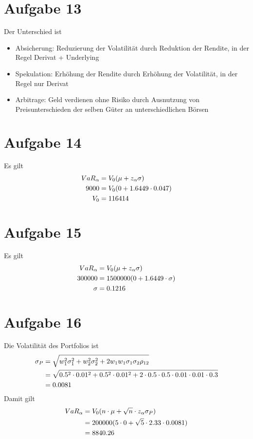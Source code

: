 \documentclass{article}
\begin{document}
	\section*{Aufgabe 13}
	Der Unterschied ist
	\begin{itemize}
		\item Absicherung: Reduzierung der Volatilität durch Reduktion der Rendite, in der Regel Derivat + Underlying
		\item Spekulation: Erhöhung der Rendite durch Erhöhung der Volatilität, in der Regel nur Derivat
		\item Arbitrage: Geld verdienen ohne Risiko durch Ausnutzung von Preisunterschieden der selben Güter an unterschiedlichen Börsen
	\end{itemize}
	
	\section*{Aufgabe 14}
	Es gilt
	\begin{align}
		VaR_{\alpha} &= V_0(\mu + z_{\alpha}\sigma) \notag \\
		9000 &= V_0(0 + 1.6449\cdot 0.047) \notag \\
		V_0 &= 116414 \notag
	\end{align}
	
	\section*{Aufgabe 15}
	Es gilt
	\begin{align}
		VaR_{\alpha} &= V_0(\mu + z_{\alpha}\sigma) \notag \\
		300000 &= 1500000(0 + 1.6449\cdot \sigma) \notag \\
		\sigma &= 0.1216 \notag
	\end{align}
	
	\section*{Aufgabe 16}
	Die Volatilität des Portfolios ist
	\begin{align}
		\sigma_P &= \sqrt{w_1^2\sigma_1^2 + w_2^2\sigma_2^2 + 2w_1w_1\sigma_1\sigma_2\rho_{12}} \notag \\
		&= \sqrt{0.5^2\cdot 0.01^2 + 0.5^2\cdot 0.01^2 + 2\cdot 0.5\cdot 0.5\cdot 0.01\cdot 0.01\cdot 0.3} \notag \\
		&= 0.0081 \notag
	\end{align}
	Damit gilt
	\begin{align}
		VaR_{\alpha} &= V_0(n\cdot \mu + \sqrt{n}\cdot z_{\alpha}\sigma_P) \notag \\
		&= 200000(5\cdot 0 + \sqrt{5}\cdot 2.33\cdot 0.0081) \notag \\
		&= 8840.26 \notag
	\end{align}
\end{document}
